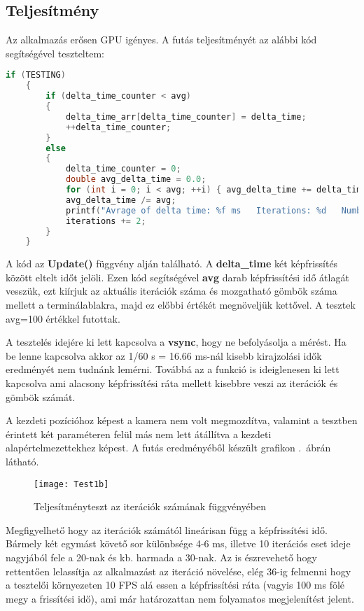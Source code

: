 \cleardoublepage
\subsection{Teljesítmény}

Az alkalmazás erősen GPU igényes.  A futás teljesítményét az alábbi kód segítségével teszteltem:
\begin{lstlisting}[language={C++}]
if (TESTING)
	{
		if (delta_time_counter < avg)
		{
			delta_time_arr[delta_time_counter] = delta_time;
			++delta_time_counter;
		}
		else
		{
			delta_time_counter = 0;
			double avg_delta_time = 0.0;
			for (int i = 0; i < avg; ++i) { avg_delta_time += delta_time_arr[i]; }
			avg_delta_time /= avg;
			printf("Avrage of delta time: %f ms   Iterations: %d   Number of spheres: %d \n", avg_delta_time*1000, iterations, ballCount);
			iterations += 2;
		}
	}
\end{lstlisting}

A kód az \textbf{Update()} függvény alján található. A \textbf{delta\_time} két képfrissítés között eltelt időt jelöli. Ezen kód segítségével \textbf{avg} darab képfrissítési idő átlagát vesszük, ezt kiírjuk az aktuális iterációk száma és mozgatható gömbök száma mellett a terminálablakra, majd ez előbbi értékét megnöveljük kettővel. A tesztek avg=100 értékkel futottak.

A tesztelés idejére ki lett kapcsolva a \textbf{vsync}, hogy ne befolyásolja a mérést. Ha be lenne kapcsolva akkor az 1/60 s = 16.66 ms-nál kisebb kirajzolási idők eredményét nem tudnánk lemérni. Továbbá az a funkció is ideiglenesen ki lett kapcsolva ami alacsony képfrissítési ráta mellett kisebbre veszi az iterációk és gömbök számát.

A kezdeti pozícióhoz képest a kamera nem volt megmozdítva, valamint a tesztben érintett két paraméteren felül más nem lett átállítva a kezdeti alapértelmezettekhez képest. A futás eredményéből készült grafikon .~ábrán látható.

\begin{figure}[H]
	\centering
	\texttt{[image: Test1b]}
	\caption{Teljesítményteszt az iterációk számának függvényében}
	\label{fig:Test1}
\end{figure}


Megfigyelhető hogy az iterációk számától lineárisan függ a képfrissítési idő. Bármely két egymást követő sor különbsége 4-6 ms, illetve 10 iterációs eset ideje nagyjából fele a 20-nak és kb. harmada a 30-nak. Az is észrevehető hogy rettentően lelassítja az alkalmazást az iteráció növelése, elég 36-ig felmenni hogy a tesztelői környezeten 10 FPS alá essen a képfrissítési ráta (vagyis 100 ms fölé megy a frissítési idő), ami már határozattan nem folyamatos megjelenítést jelent.

